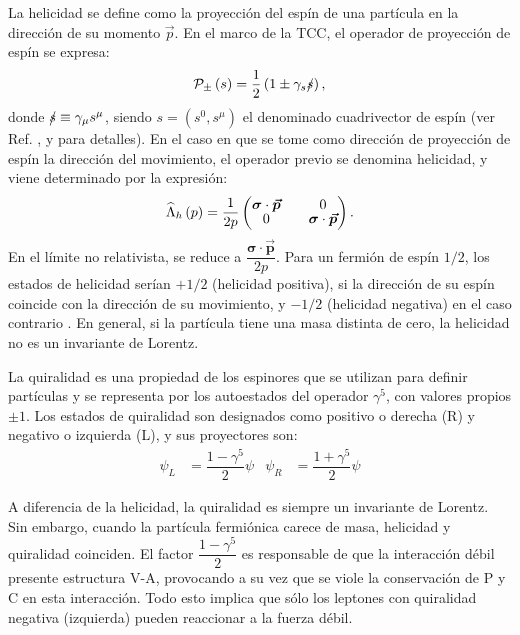 La helicidad se define como la proyección del espín de una partícula en la dirección de su momento $\vec{p}$. En el marco de la TCC, el operador de proyección de espín se expresa:
\begin{equation}
\mathcal{P}_{\pm}\left(s\right)=\dfrac{1}{2} \left(1 \pm \gamma _{s}\slashed{s}\right),
\end{equation} 
donde $\slashed{s}\equiv \gamma_{\mu} s^{\mu}$, siendo $s=\left(s^0, s^{\mu}\right)$ el denominado cuadrivector de espín (ver Ref. \cite{GreinerRQM}, \cite{Griffiths} y \cite{MCR} para detalles). En el caso en que se tome como dirección de proyección de espín la dirección del movimiento, el operador previo se denomina helicidad, y viene determinado por la expresión:
\begin{equation}
\begingroup 
\renewcommand*{\arraystretch}{0.8}
\setlength\arraycolsep{10pt}
\widehat{\Lambda}_{h}\left(p\right)=\dfrac{1}{2p} \begin{pmatrix} 
\boldsymbol{\sigma} \cdot \boldsymbol{\vec{p}} & 0 \\ 0 & \boldsymbol{\sigma} \cdot \boldsymbol{\vec{p}} \end{pmatrix}.
\endgroup
\end{equation}
\newline
En el límite no relativista, se reduce a $\dfrac{\boldsymbol{\sigma} \cdot \boldsymbol{\vec{p}} }{2p}$. Para un fermión de espín $1/2$, los estados de helicidad serían $+1/2$ (helicidad positiva), si la dirección de su espín coincide con la dirección de su movimiento, y $-1/2$ (helicidad negativa) en el caso contrario \cite{Bettini}. En general, si la partícula tiene una masa distinta de cero, la helicidad no es un invariante de Lorentz.

La quiralidad es una propiedad de los espinores que se utilizan para definir partículas y se representa por los autoestados del operador $\gamma^5$, con valores propios $\pm 1$. Los estados de quiralidad son designados como positivo o derecha (R) y negativo o izquierda (L), y sus proyectores son:
\begin{align}
\psi_L &= \dfrac{1-\gamma^5}{2}\psi & \psi_R &= \dfrac{1+\gamma^5}{2}\psi
\end{align}

A diferencia de la helicidad, la quiralidad es siempre un invariante de Lorentz. Sin embargo, cuando la partícula fermiónica carece de masa, helicidad y quiralidad coinciden.
El factor $\dfrac{1-\gamma^5}{2}$ es responsable de que la interacción débil presente estructura V-A, provocando a su vez que se viole la conservación de P y C en esta interacción. Todo esto implica que sólo los leptones con quiralidad negativa (izquierda) pueden reaccionar a la fuerza débil.